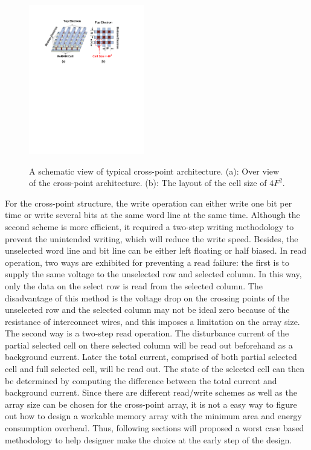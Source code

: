 \begin{figure}
\centering
  \includegraphics[width=0.45\textwidth]{./figures/crossbar_array2.pdf}\\
  \caption{A schematic view of typical cross-point architecture. (a): Over view of the cross-point architecture. (b): The layout of the cell size of $4F^2$. }\label{fig:array}
\vspace{-10pt}
\end{figure}

For the cross-point structure, the write operation can either write one bit per time or write several bits at the same word line at the same time. Although the second scheme is more efficient, it required a two-step writing methodology to prevent the unintended writing, which will reduce the write speed. Besides, the unselected word line and bit line can be either left floating or half biased. In read operation, two ways are exhibited for preventing a read failure: the first is to supply the same voltage to the unselected row and selected column. In this way, only the data on the select row is read from the selected column. The disadvantage of this method is the voltage drop on the crossing points of the unselected row and the selected column may not be ideal zero because of the resistance of interconnect wires, and this imposes a limitation on the array size. The second way is a two-step read operation. The disturbance current of the partial selected cell on there selected column will be read out beforehand as a background current. Later the total current, comprised of both partial selected cell and full selected cell, will be read out. The state of the selected cell can then be determined by computing the difference between the total current and background current. Since there are different read/write schemes as well as the array size can be chosen for the cross-point array, it is not a easy way to figure out how to design a workable memory array with the minimum area and energy consumption overhead. Thus, following sections will proposed a worst case based methodology to help designer make the choice at the early step of the design.


